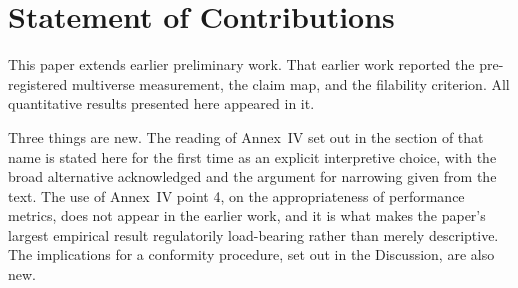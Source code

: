 \documentclass[letterpaper]{article} %
\begin{document}
\section{Statement of Contributions}

This paper extends earlier preliminary work. That earlier work reported the
pre-registered multiverse measurement, the claim map, and the filability
criterion. All quantitative results presented here appeared in it.

Three things are new. The reading of Annex~IV set out in the section of that
name is stated here for the first time as an explicit interpretive choice, with
the broad alternative acknowledged and the argument for narrowing given from the
text. The use of Annex~IV point 4, on the appropriateness of performance
metrics, does not appear in the earlier work, and it is what makes the paper's
largest empirical result regulatorily load-bearing rather than merely
descriptive. The implications for a conformity procedure, set out in the
Discussion, are also new.


\end{document}
